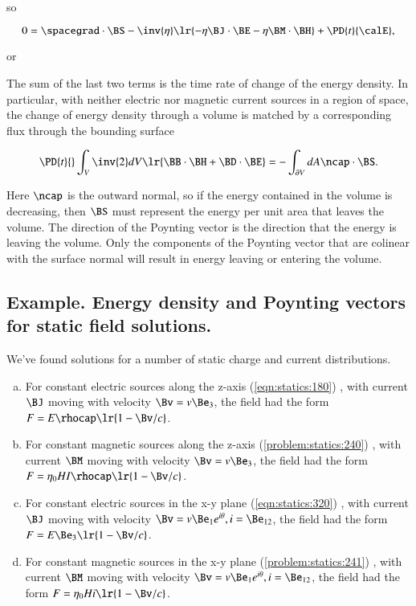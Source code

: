 so

\begin{dmath}\label{eqn:poyntingF:180}
0 =
\spacegrad \cdot \BS
-
\inv{\eta}
\lr{
- \eta \BJ \cdot \BE
- \eta \BM \cdot \BH
}
+ \PD{t}{\calE},
\end{dmath}

or

The sum of the last two terms is the time rate of change of the energy density.
In particular,
with neither electric nor magnetic current sources in a region of space,
the change of energy density through a volume is matched by a corresponding flux through the bounding surface

\begin{dmath}\label{eqn:maxwellsEquations:740}
\PD{t}{} \int_V
\inv{2} dV \lr{
\BB \cdot \BH
+ \BD \cdot \BE
}
=
-\int_{\partial V} dA \ncap \cdot \BS.
\end{dmath}

Here \( \ncap \) is the outward normal, so if the energy contained in the volume is decreasing, then \( \BS \) must represent the energy per unit area that leaves the volume.
The direction of the Poynting vector is the direction that the energy is leaving the volume.
Only the components of the Poynting vector that are colinear with the surface normal will result in energy leaving or entering the volume.

\subsection{Example.  Energy density and Poynting vectors for static field solutions.}

We've found solutions for a number of static charge and current distributions.

\begin{enumerate}[(a)]
\item For constant electric sources along the z-axis
(\cref{eqn:statics:180})
, with current \( \BJ \) moving with velocity \( \Bv = v \Be_3 \), the field had the form \( F = E \rhocap \lr{ 1 - \Bv/c } \).
\item For constant magnetic sources along the z-axis
(\cref{problem:statics:240})
, with current \( \BM \) moving with velocity \( \Bv = v \Be_3 \), the field had the form \( F = \eta_0 H I \rhocap \lr{ 1 - \Bv/c } \).
\item For constant electric sources in the x-y plane
(\cref{eqn:statics:320})
, with current \( \BJ \) moving with velocity \( \Bv = v \Be_1 e^{i\theta}, i = \Be_{12} \), the field had the form \( F = E \Be_3 \lr{ 1 - \Bv/c } \).
\item For constant magnetic sources in the x-y plane
(\cref{problem:statics:241})
, with current \( \BM \) moving with velocity \( \Bv = v \Be_1 e^{i\theta}, i = \Be_{12} \), the field had the form \( F = \eta_0 H i \lr{ 1 - \Bv/c } \).
\end{enumerate}

